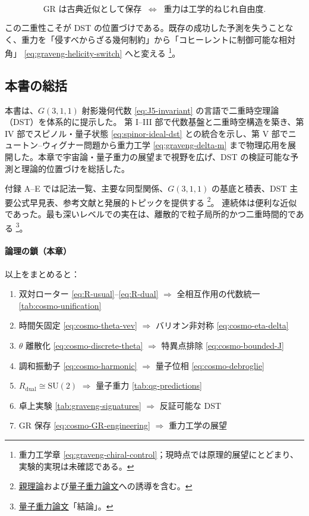 \documentclass[dvipdfmx,a4paper,oneside]{jsbook}
\numberwithin{equation}{chapter}
\begin{document}
\begin{equation}
  \boxed{\;
  \text{GR は古典近似として保存}
  \;\;\Longleftrightarrow\;\;
  \text{重力は工学的ねじれ自由度}.
  \;}
  \label{eq:cosmo-GR-engineering}
\end{equation}

この二重性こそが DST の位置づけである。既存の成功した予測を失うことなく、重力を「侵すべからざる幾何制約」から「コヒーレントに制御可能な相対角」 \eqref{eq:graveng-helicity-switch} へと変える \footnote{重力工学章 \eqref{eq:graveng-chiral-control}；現時点では原理的展望にとどまり、実験的実現は未確認である。}。

\subsection{本書の総括}

本書は、\(G(3,1,1)\) 射影幾何代数 \eqref{eq:J5-invariant} の言語で二重時空理論（DST）を体系的に提示した。
第 I–III 部で代数基盤と二重時空構造を築き、第 IV 部でスピノル・量子状態 \eqref{eq:spinor-ideal-dst} との統合を示し、第 V 部でニュートン--ウィグナー問題から重力工学 \eqref{eq:graveng-delta-m} まで物理応用を展開した。本章で宇宙論・量子重力の展望まで視野を広げ、DST の検証可能な予測と理論的位置づけを総括した。

付録 A–E では記法一覧、主要な同型関係、\(G(3,1,1)\) の基底と積表、DST 主要公式早見表、参考文献と発展的トピックを提供する \footnote{\hyperref[sec:sister-manuscripts]{親理論}および\hyperref[sec:sister-manuscripts]{量子重力論文}への誘導を含む。}。
連続体は便利な近似であった。最も深いレベルでの実在は、離散的で粒子局所的かつ二重時間的である \footnote{\hyperref[sec:sister-manuscripts]{量子重力論文}「結論」。}。

\paragraph{論理の鎖（本章）}
以上をまとめると：
\begin{enumerate}[leftmargin=2em]
  \item 双対ローター \eqref{eq:R-usual}–\eqref{eq:R-dual} \(\Rightarrow\) 全相互作用の代数統一 \ref{tab:cosmo-unification}
  \item 時間矢固定 \eqref{eq:cosmo-theta-vev} \(\Rightarrow\) バリオン非対称 \eqref{eq:cosmo-eta-delta}
  \item \(\theta\) 離散化 \eqref{eq:cosmo-discrete-theta} \(\Rightarrow\) 特異点排除 \eqref{eq:cosmo-bounded-J}
  \item 調和振動子 \eqref{eq:cosmo-harmonic} \(\Rightarrow\) 量子位相 \eqref{eq:cosmo-debroglie}
  \item \(R_{\mathrm{dual}} \cong \mathrm{SU}(2)\) \(\Rightarrow\) 量子重力 \ref{tab:qg-predictions}
  \item 卓上実験 \eqref{tab:graveng-signatures} \(\Rightarrow\) 反証可能な DST
  \item GR 保存 \eqref{eq:cosmo-GR-engineering} \(\Rightarrow\) 重力工学の展望
\end{enumerate}
\end{document}
